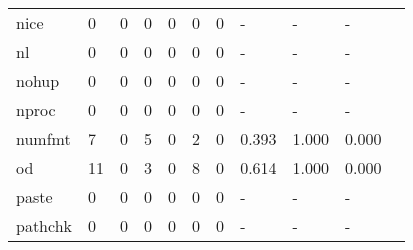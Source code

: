 \begin{longtable}{lp{1.10cm}p{1.10cm}p{1.10cm}p{1.10cm}p{1.10cm}p{1.10cm}p{1.10cm}p{1.10cm}p{1.10cm}p{1.10cm}}
nice      &                      0 &                                  0 &                                 0 &                                0 &                                 0 &                               0 &                              - &                                     - &                                   - \\
nl        &                      0 &                                  0 &                                 0 &                                0 &                                 0 &                               0 &                              - &                                     - &                                   - \\
nohup     &                      0 &                                  0 &                                 0 &                                0 &                                 0 &                               0 &                              - &                                     - &                                   - \\
nproc     &                      0 &                                  0 &                                 0 &                                0 &                                 0 &                               0 &                              - &                                     - &                                   - \\
numfmt    &                      7 &                                  0 &                                 5 &                                0 &                                 2 &                               0 &                          0.393 &                                 1.000 &                               0.000 \\
od        &                     11 &                                  0 &                                 3 &                                0 &                                 8 &                               0 &                          0.614 &                                 1.000 &                               0.000 \\
paste     &                      0 &                                  0 &                                 0 &                                0 &                                 0 &                               0 &                              - &                                     - &                                   - \\
pathchk   &                      0 &                                  0 &                                 0 &                                0 &                                 0 &                               0 &                              - &                                     - &                                   - \\

\end{longtable}
